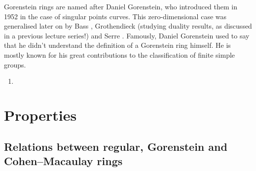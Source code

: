 \documentclass[10pt,a4paper]{article}
\begin{document}
\begin{remark}
  Gorenstein rings are named after Daniel Gorenstein, who introduced them in 1952 \cite{gorenstein-arithmetic-theory-adjoint-plane-curves} in the case of singular points curves. This zero-dimensional case was generalised later on by Bass \cite{bass-ubiquity-gorenstein-rings}, Grothendieck \cite{grothendieck-theoremes-de-dualite} (studying duality results, as discussed in a previous lecture series!) and Serre \cite{serre-sur-les-modules-projectifs}. Famously, Daniel Gorenstein used to say that he didn't understand the definition of a Gorenstein ring himself. He is mostly known for his great contributions to the classification of finite simple groups.
\end{remark}

\begin{enumerate}
  \item 
\end{enumerate}


\section{Properties}
\subsection{Relations between regular, Gorenstein and Cohen--Macaulay rings}
\end{document}
